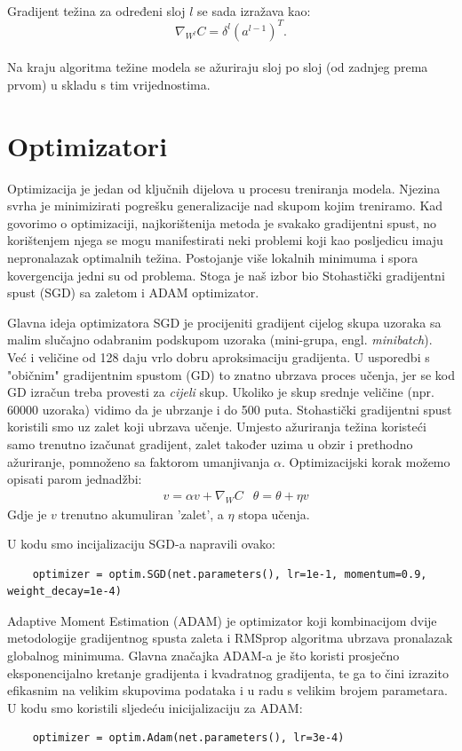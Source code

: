		\noindent\\Gradijent težina za određeni sloj \(l\) se sada izražava kao:
		\[\nabla _{W^{l}}C=\delta ^{l}(a^{l-1})^{T}.\]
		\noindent\\Na kraju algoritma težine modela se ažuriraju sloj po sloj (od zadnjeg prema prvom) u skladu s tim vrijednostima.  


\section{Optimizatori}

Optimizacija je jedan od ključnih dijelova u procesu treniranja modela. Njezina svrha je minimizirati pogrešku generalizacije nad skupom kojim treniramo.
Kad govorimo o optimizaciji, najkorištenija metoda je svakako gradijentni spust, no korištenjem njega se mogu manifestirati neki problemi koji kao posljedicu imaju nepronalazak optimalnih težina. Postojanje više lokalnih minimuma i spora kovergencija jedni su od problema. Stoga je naš izbor bio Stohastički gradijentni spust (SGD) sa zaletom i ADAM optimizator. 

Glavna ideja optimizatora SGD je procijeniti gradijent cijelog skupa uzoraka sa malim slučajno odabranim podskupom uzoraka (mini-grupa, engl. \textit{minibatch}). Već i veličine od 128 daju vrlo dobru aproksimaciju gradijenta. U usporedbi s "običnim" gradijentnim spustom (GD) to znatno ubrzava proces učenja, jer se kod GD izračun treba provesti za \textit{cijeli} skup. Ukoliko je skup srednje veličine (npr. 60000 uzoraka) vidimo da je ubrzanje i do 500 puta.  Stohastički gradijentni spust koristili smo uz zalet koji ubrzava učenje. Umjesto ažuriranja težina koristeći samo trenutno izačunat gradijent, zalet također uzima u obzir i prethodno ažuriranje, pomnoženo sa faktorom umanjivanja $\alpha$. Optimizacijski korak možemo opisati parom jednadžbi:
\begin{align}
& v = \alpha v + \nabla_W C 
& \theta = \theta + \eta v
\end{align}
Gdje je $v$ trenutno akumuliran 'zalet', a $\eta$ stopa učenja.

 
U kodu smo incijalizaciju SGD-a napravili ovako:

\begin{verbatim}
	optimizer = optim.SGD(net.parameters(), lr=1e-1, momentum=0.9, weight_decay=1e-4)
\end{verbatim}

Adaptive Moment Estimation (ADAM) je optimizator koji kombinacijom dvije metodologije gradijentnog spusta zaleta i RMSprop algoritma ubrzava pronalazak globalnog minimuma. Glavna značajka ADAM-a je što koristi prosječno eksponencijalno kretanje gradijenta i kvadratnog gradijenta, te ga to čini izrazito efikasnim na velikim skupovima podataka i u radu s velikim brojem parametara. U kodu smo koristili sljedeću inicijalizaciju za ADAM:

\begin{verbatim}
	optimizer = optim.Adam(net.parameters(), lr=3e-4)
\end{verbatim}